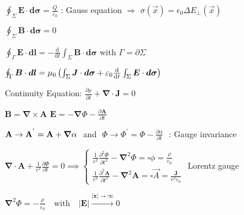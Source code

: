 \item $ \oint_{\Sigma}\boldsymbol{E} \cdot \boldsymbol{d\sigma} = \frac{Q}{\varepsilon_0}$ : Gauss equation
$\Longrightarrow$ \squishsep $\sigma(\vec{x}) = \epsilon_0 \Delta E_{\perp}(\vec{x})$

\item $ \oint_{\Sigma}\boldsymbol{B} \cdot \boldsymbol{d\sigma} = 0$

\item $ \oint_{\Gamma} \boldsymbol{E} \cdot \boldsymbol{dl} = -\frac{\text{d}}{\text{d}t}\int_{\Sigma} \boldsymbol{B} \cdot \boldsymbol{d\sigma}$ with $\Gamma=\partial\Sigma$

\item $ \oint_{\Gamma} \boldsymbol{B} \cdot \boldsymbol{dl} = \mu_0 \left(\int_{\Sigma} \boldsymbol{J} \cdot \boldsymbol{d\sigma} + \varepsilon_0 \frac{\ud }{\ud t}\int_{\Sigma} \boldsymbol{E} \cdot \boldsymbol{d\sigma}\right)$ 

\item Continuity Equation: $\frac{\partial \rho}{\partial t} + \boldsymbol{\nabla}\cdot\boldsymbol{J} = 0$
\squishend
\columnbreak


\squishlist
\item $\boldsymbol{B} = \boldsymbol{\nabla} \times \boldsymbol{A}$ \squishsep $\boldsymbol{E} = -\boldsymbol{\nabla} \Phi - \frac{\partial \boldsymbol{A}}{\partial t}$

\item $\vec{\rm{A}} \rightarrow \vec{\rm{A}}^{'} = \vec{\rm{A}} + \vec{\nabla}\alpha \,\,$  and  $\,\, \Phi \rightarrow \Phi^{'} = \Phi - \frac{\partial\alpha}{\partial t} \,\,$ : Gauge invariance 

\item $\boldsymbol{\nabla} \cdot \boldsymbol{A} + \frac{1}{c^2}\frac{\partial \Phi}{\partial t}=0\implies
\begin{cases}
	\frac{1}{c^2}\frac{\partial^2 \Phi }{\partial t^2} - \boldsymbol{\nabla}^2 \Phi = \square \phi = \frac{\rho}{\varepsilon_0} \\
	\frac{1}{c^2}\frac{\partial^2 \boldsymbol{A}}{\partial t^2} - \boldsymbol{\nabla}^2 \boldsymbol{A} = \square \vec{A} =  \frac{\boldsymbol{J}}{c^2\varepsilon_0}
\end{cases}$ Lorentz gauge
\squishend


\squishlist
\item $\boldsymbol{\nabla}^2\Phi = -\frac{\rho}{\varepsilon_0} \quad \text{with} \quad |\boldsymbol{E}| \overset{|\boldsymbol{x}|\to \infty}{\longrightarrow} 0$

